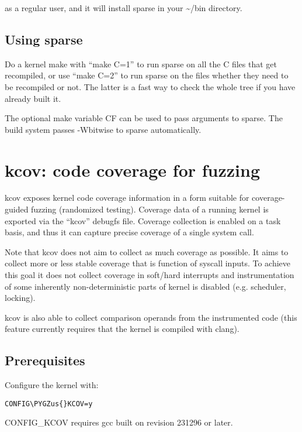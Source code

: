 \documentclass[a4paper,8pt,english]{sphinxmanual}
\def\PYGZus{\char`\_}
\begin{document}
as a regular user, and it will install sparse in your \textasciitilde{}/bin directory.


\section{Using sparse}
\label{dev-tools/sparse:using-sparse}
Do a kernel make with ``make C=1'' to run sparse on all the C files that get
recompiled, or use ``make C=2'' to run sparse on the files whether they need to
be recompiled or not.  The latter is a fast way to check the whole tree if you
have already built it.

The optional make variable CF can be used to pass arguments to sparse.  The
build system passes -Wbitwise to sparse automatically.


\chapter{kcov: code coverage for fuzzing}
\label{dev-tools/kcov::doc}\label{dev-tools/kcov:kcov-code-coverage-for-fuzzing}
kcov exposes kernel code coverage information in a form suitable for coverage-
guided fuzzing (randomized testing). Coverage data of a running kernel is
exported via the ``kcov'' debugfs file. Coverage collection is enabled on a task
basis, and thus it can capture precise coverage of a single system call.

Note that kcov does not aim to collect as much coverage as possible. It aims
to collect more or less stable coverage that is function of syscall inputs.
To achieve this goal it does not collect coverage in soft/hard interrupts
and instrumentation of some inherently non-deterministic parts of kernel is
disabled (e.g. scheduler, locking).

kcov is also able to collect comparison operands from the instrumented code
(this feature currently requires that the kernel is compiled with clang).


\section{Prerequisites}
\label{dev-tools/kcov:prerequisites}
Configure the kernel with:

\begin{Verbatim}[commandchars=\\\{\}]
CONFIG\PYGZus{}KCOV=y
\end{Verbatim}

CONFIG\_KCOV requires gcc built on revision 231296 or later.
\end{document}
